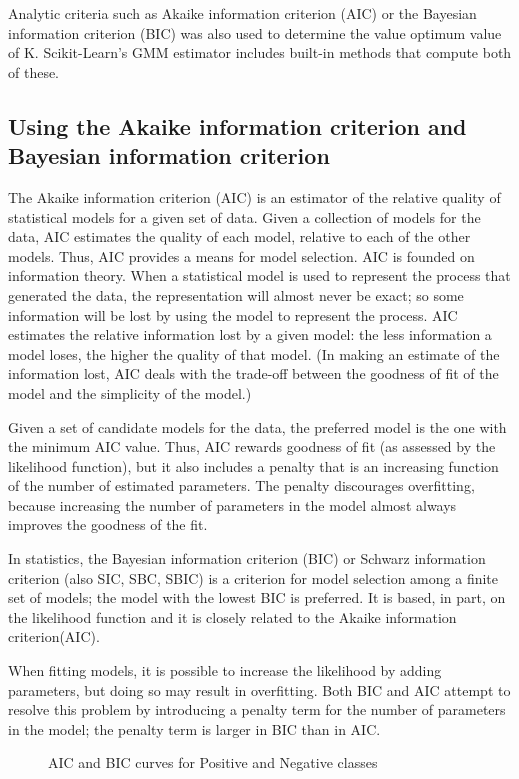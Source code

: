 \documentclass[a4paper,twoside,12pt]{report}
\begin{document}
Analytic criteria such as Akaike information criterion (AIC) or the Bayesian information criterion (BIC) was also used to determine the value optimum value of K.   Scikit-Learn's GMM estimator includes built-in methods that compute both of these. 

\subsection {Using the Akaike information criterion and Bayesian information criterion}
The Akaike information criterion (AIC) is an estimator of the relative quality of statistical models for a given set of data. Given a collection of models for the data, AIC estimates the quality of each model, relative to each of the other models. Thus, AIC provides a means for model selection.
AIC is founded on information theory. When a statistical model is used to represent the process that generated the data, the representation will almost never be exact; so some information will be lost by using the model to represent the process. AIC estimates the relative information lost by a given model: the less information a model loses, the higher the quality of that model. (In making an estimate of the information lost, AIC deals with the trade-off between the goodness of fit of the model and the simplicity of the model.)

Given a set of candidate models for the data, the preferred model is the one with the minimum AIC value. Thus, AIC rewards goodness of fit (as assessed by the likelihood function), but it also includes a penalty that is an increasing function of the number of estimated parameters. The penalty discourages overfitting, because increasing the number of parameters in the model almost always improves the goodness of the fit.

In statistics, the Bayesian information criterion (BIC) or Schwarz information criterion (also SIC, SBC, SBIC) is a criterion for model selection among a finite set of models; the model with the lowest BIC is preferred. It is based, in part, on the likelihood function and it is closely related to the Akaike information criterion(AIC).

When fitting models, it is possible to increase the likelihood by adding parameters, but doing so may result in overfitting. Both BIC and AIC attempt to resolve this problem by introducing a penalty term for the number of parameters in the model; the penalty term is larger in BIC than in AIC.

\begin{figure}[!htbp]
\centering
{} %
{}
\caption{AIC and BIC curves for Positive and Negative classes}
\label{fig:subfigures}
\end{figure}
\end{document}
